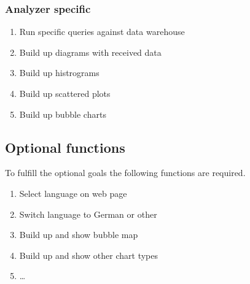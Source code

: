 \subsubsection*{Analyzer specific} 
 
\begin{enumerate}[resume]
  
  \item Run specific queries against data warehouse  
  
  \item Build up diagrams with received data  %
  
  \item Build up histrograms
  
  \item Build up scattered plots
  
  \item Build up bubble charts

\end{enumerate}


\subsection{Optional functions}

To fulfill the optional goals the following functions are required.

\begin{enumerate}[resume]
  
  \item Select language on web page
  
  \item Switch language to German or other
  
  \item Build up and show bubble map %
  
  \item Build up and show other chart types
  
  \item \ldots 
 
\end{enumerate}
